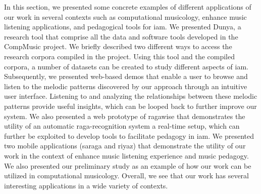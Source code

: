 In this section, we presented some concrete examples of different applications of our work in several contexts such as computational musicology, enhance music listening applications, and pedagogical tools for \gls{iam}. We presented Dunya, a research tool that comprise all the data and software tools developed in the CompMusic project. We briefly described two different ways to access the research corpora compiled in the project. Using this tool and the compiled corpora, a number of datasets can be created to study different aspects of \gls{iam}. Subsequently, we presented web-based demos that enable a user to browse and listen to the melodic patterns discovered by our approach through an intuitive user interface. Listening to and analyzing the relationships between these melodic patterns provide useful insights, which can be looped back to further improve our system. We also presented a web prototype of \gls{ragawise} that demonstrates the utility of an automatic raga-recognition system a real-time setup, which can further be exploited to develop tools to facilitate pedagogy in \gls{iam}. We presented two mobile applications (\gls{saraga} and \gls{riyaz}) that demonstrate the utility of our work in the context of enhance music listening experience and music pedagogy. We also presented our preliminary study as an example of how our work can be utilized in computational musicology. Overall, we see that our work has several interesting applications in a wide variety of contexts.

